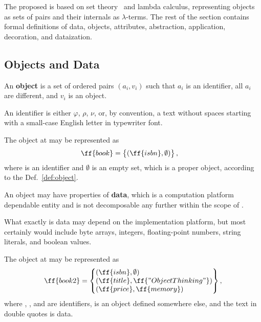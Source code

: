 The proposed \phic{} is based on set theory~\citep{jech2013set} and lambda calculus,
representing objects as sets of pairs and their internals as $\lambda$-terms.
The rest of the section contains formal definitions of
data, objects, attributes, abstraction, application, decoration, and dataization.

\subsection{Objects and Data}

\begin{eodefinition}\label{def:object}
An \textbf{object} is a set of ordered pairs $(a_i, v_i)$ such that
$a_i$ is an identifier, all $a_i$ are different, and $v_i$ is an object.
\end{eodefinition}

An identifier is either $\varphi$, $\rho$, $\nu$, or, by convention, a text without
spaces starting with a small-case English letter in typewriter font.

The object at  may be represented as
\begin{equation}\label{eq:book}
\begin{split}
\ff{book} & = \left\{\begin{matrix*}[l]
  (\ff{isbn}, \emptyset) \\
\end{matrix*}\right\},
\end{split}
\end{equation}
where  is an identifier and $\emptyset$ is an empty
set, which is a proper object, according to the Def.~\ref{def:object}.

\begin{eodefinition}\label{def:data}
An object may have properties of \textbf{data},
which is a computation platform dependable entity and is not
decomposable any further within the scope of \phic{}.
\end{eodefinition}

What exactly is data may depend on the
implementation platform, but most certainly would include
byte arrays, integers, floating-point numbers,
string literals, and boolean values.

The object at  may be represented as
\begin{equation}\label{eq:book2}
\begin{split}
\ff{book2} & = \left\{\begin{matrix*}[l]
  (\ff{isbn}, \emptyset) \\
  (\ff{title}, \ff{"Object Thinking"}) \\
  (\ff{price}, \ff{memory}) \\
\end{matrix*}\right\}, \\
\end{split}
\end{equation}
where , , and  are identifiers,
 is an object defined somewhere else,
and the text in double quotes is data.

